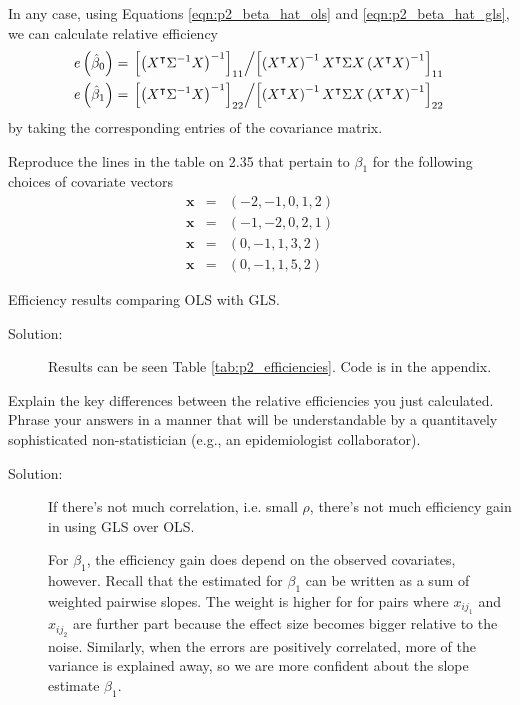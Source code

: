 \documentclass[11pt, letterpaper]{article}
\newcommand{\bx}{{\bm x}}
\newcommand{\beas}{\begin{eqnarray*}}
\newcommand{\eeas}{\end{eqnarray*}}
\begin{document}
\begin{enumerate}[(a)]
\begin{description}
  In any case, using Equations \ref{eqn:p2_beta_hat_ols} and
  \ref{eqn:p2_beta_hat_gls}, we can calculate relative efficiency
  \begin{align*}
    e\left(\hat{\beta}_0\right)
    &= \left.
      \left[\left(X^{\intercal}\Sigma^{-1}X\right)^{-1}\right]_{11}
      \middle/
      \left[\left(X^{\intercal}X\right)^{-1}X^\intercal
      \Sigma
      X\left(X^{\intercal}X\right)^{-1}\right]_{11}
      \right. \\
    e\left(\hat{\beta}_1\right)
    &= \left.
      \left[\left(X^{\intercal}\Sigma^{-1}X\right)^{-1}\right]_{22}
      \middle/
      \left[\left(X^{\intercal}X\right)^{-1}X^\intercal
      \Sigma
      X\left(X^{\intercal}X\right)^{-1}\right]_{22}
      \right.
  \end{align*}
  by taking the corresponding entries of the covariance matrix.
\end{description}
{\em \item Reproduce the lines in the table on 2.35 that pertain to $\beta_1$ for the following choices of covariate vectors
\beas
\bx&=&(-2,-1,0,1,2)\\
\bx&=&(-1,-2,0,2,1)\\
\bx&=&(0,-1,1,3,2)\\
\bx&=&(0,-1,1,5,2)
\eeas}


\begin{table}[ht!]
  \scriptsize
  \centering
  
  \caption{Efficiency results comparing OLS with GLS.}
  \label{tab:p2_efficiencies}
\end{table}

\begin{description}
\item[Solution:] Results can be seen Table \ref{tab:p2_efficiencies}. Code is in the appendix.
\end{description}

{\em \item Explain the key differences between the relative efficiencies you just calculated.  Phrase your answers in a manner that will be understandable by
a quantitavely sophisticated non-statistician (e.g., an epidemiologist collaborator).
}

\begin{description}
\item[Solution:] If there's not much correlation, i.e. small $\rho$, there's not
  much efficiency gain in using GLS over OLS.

  For $\beta_1$, the efficiency gain does depend on the observed covariates,
  however. Recall that the estimated for $\beta_1$ can be written as a sum of
  weighted pairwise slopes. The weight is higher for for pairs where $x_{ij_1}$
  and $x_{ij_2}$ are further part because the effect size becomes bigger
  relative to the noise. Similarly, when the errors are positively correlated,
  more of the variance is explained away, so we are more confident about the
  slope estimate $\beta_1$.


\end{description}
\end{enumerate}
\end{document}
